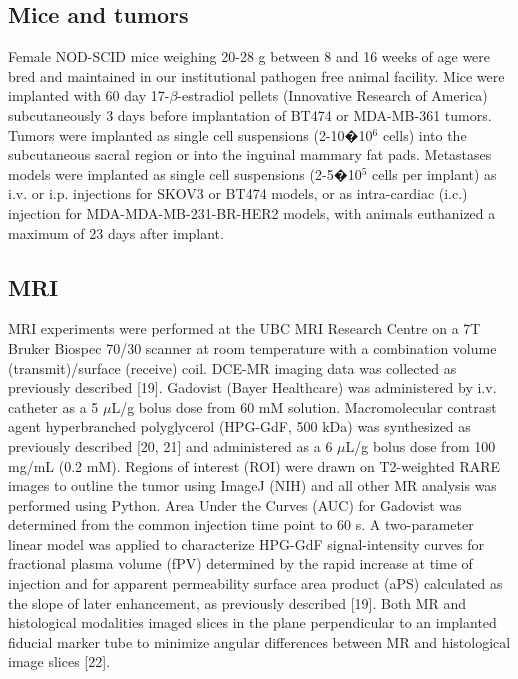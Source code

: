 \subsection{Mice and tumors}

Female NOD-SCID mice weighing 20-28 g between 8 and 16 weeks of age were bred and maintained in our institutional pathogen free animal facility.
Mice were implanted with 60 day 17-$\beta$-estradiol pellets (Innovative Research of America) subcutaneously 3 days before implantation of BT474 or MDA-MB-361 tumors.
Tumors were implanted as single cell suspensions (2-10�10$^6$ cells) into the subcutaneous sacral region or into the inguinal mammary fat pads.
Metastases models were implanted as single cell suspensions (2-5�10$^5$ cells per implant) as i.v. or i.p. injections for SKOV3 or BT474 models, or as intra-cardiac (i.c.) injection for MDA-MDA-MB-231-BR-HER2 models, with animals euthanized a maximum of 23 days after implant.

\subsection{MRI}
MRI experiments were performed at the UBC MRI Research Centre on a 7T Bruker Biospec 70/30 scanner at room temperature with a combination volume (transmit)/surface (receive) coil.
DCE-MR imaging data was collected as previously described [19].
Gadovist (Bayer Healthcare) was administered by i.v. catheter as a 5 $\mu$L/g bolus dose from 60 mM solution.
Macromolecular contrast agent hyperbranched polyglycerol (HPG-GdF, 500 kDa) was synthesized as previously described [20, 21] and administered as a 6 $\mu$L/g bolus dose from 100 mg/mL (0.2 mM).
Regions of interest (ROI) were drawn on T2-weighted RARE images to outline the tumor using ImageJ (NIH) and all other MR analysis was performed using Python.
Area Under the Curves (AUC) for Gadovist was determined from the common injection time point to 60 s.
A two-parameter linear model was applied to characterize HPG-GdF signal-intensity curves for fractional plasma volume (fPV) determined by the rapid increase at time of injection and for apparent permeability surface area product (aPS) calculated as the slope of later enhancement, as previously described [19].
Both MR and histological modalities imaged slices in the plane perpendicular to an implanted fiducial marker tube to minimize angular differences between MR and histological image slices [22].


